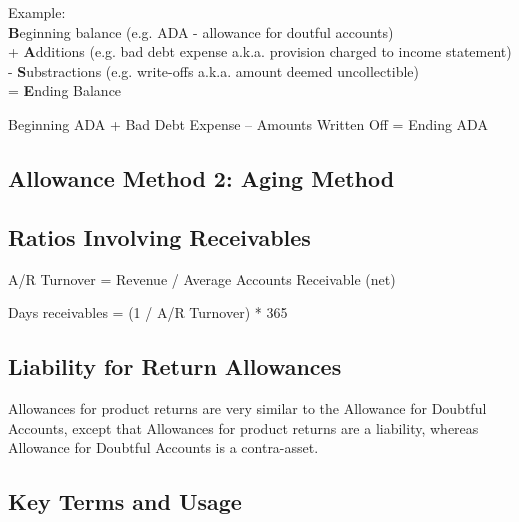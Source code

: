 Example: \\

\textbf{B}eginning balance (e.g. ADA - allowance for doutful accounts) \\
+ \textbf{A}dditions (e.g. bad debt expense a.k.a. provision charged to income statement)\\
- \textbf{S}ubstractions (e.g. write-offs a.k.a. amount deemed uncollectible) \\
= \textbf{E}nding Balance

Beginning ADA + Bad Debt Expense – Amounts Written Off = Ending ADA


\subsection*{Allowance Method 2: Aging Method}


\subsection*{Ratios Involving Receivables}

A/R Turnover = Revenue / Average Accounts Receivable (net)

Days receivables = (1 / A/R Turnover) * 365

\subsection*{Liability for Return Allowances}

Allowances for product returns are very similar to the Allowance for Doubtful Accounts, except that Allowances for product returns are a liability, whereas Allowance for Doubtful Accounts is a contra-asset.

\subsection*{Key Terms and Usage}


